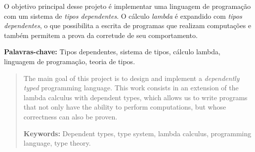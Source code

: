 \documentclass[
       embeddedlogo,
       english,
       lmodern,
       coorientadorbanca,
       noabntexcite
]{ufsc-thesis-rn46-2019}
\begin{document}

\pretextual%
\imprimircapa%
\imprimirfolhaderosto*
\imprimirfolhadecertificacao

\begin{resumo}[Resumo]
       O objetivo principal desse projeto é implementar uma linguagem de programação com um sistema de \emph{tipos dependentes}.
       O cálculo \emph{lambda} é expandido com \emph{tipos dependentes}, o que possibilita a escrita de programas que realizam computações e também permitem a prova da corretude de seu comportamento.

       \vspace{\baselineskip}
       \textbf{Palavras-chave:} Tipos dependentes, sistema de tipos, cálculo lambda, linguagem de programação, teoria de tipos.
\end{resumo}

\begin{abstract}
       The main goal of this project is to design and implement a \emph{dependently typed} programming language.
       This work consists in an extension of the lambda calculus with dependent types, which allows us to write programs that not only have the ability to perform computations, but whose correctness can also be proven.

       \vspace{\baselineskip}
       \textbf{Keywords:} Dependent types, type system, lambda calculus, programming language, type theory.
\end{abstract}

\listoffigures*
\tableofcontents*

\textual%

% 
% 

% 

\postextual
\printbibliography{}
\end{document}
